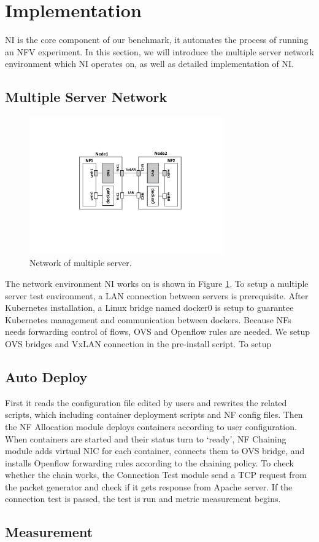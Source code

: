 \section{Implementation}
NI is the core component of our benchmark,
it automates the process of running an NFV experiment.
In this section, we will introduce the multiple server network environment
which NI operates on,
as well as detailed implementation of NI.

\subsection{Multiple Server Network}

\begin{figure}[!t]
\centering
\includegraphics[width=3.3in]{fig/network.pdf}
\caption{Network of multiple server.}
\label{network}
\end{figure}


The network environment NI works on is shown in Figure \ref{network}. 
To setup a multiple server test environment, 
a LAN connection between servers is prerequisite. 
After Kubernetes installation, a Linux bridge named docker0 is setup 
to guarantee Kubernetes management and communication between dockers.
Because NFs needs forwarding control of flows, 
OVS and Openflow rules are needed. 
We setup OVS bridges and VxLAN connection in the pre-install script.
To setup 


\subsection{Auto Deploy}
First it reads the configuration file edited by users and rewrites the related scripts,
which including container deployment scripts and NF config files.
Then the NF Allocation module deploys containers according to user configuration.
When containers are started and their status turn to `ready',
NF Chaining module adds virtual NIC for each container,
connects them to OVS bridge,
and installs Openflow forwarding rules according to the chaining policy.
To check whether the chain works,
the Connection Test module send a TCP request
from the packet generator and check if it gets response from Apache server.
If the connection test is passed,
the test is run and metric measurement begins.
\subsection{Measurement}

